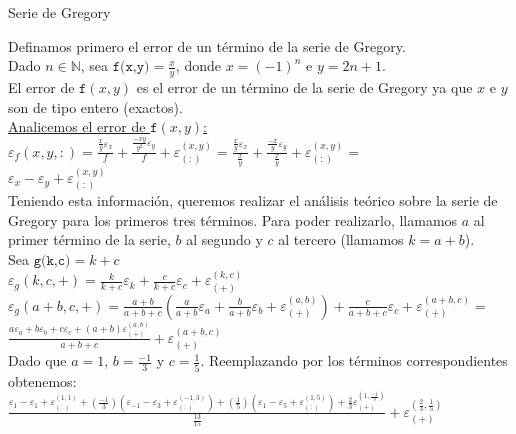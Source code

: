 \documentclass[12pt,titlepage]{article}
\newcommand{\func}[2]{\texttt{#1}(#2)}
\newcommand{\funcFull}[2]{\texttt{#1}=#2}
\newcommand{\e}[2]{\varepsilon  _{#1}({#2})}
\newcommand{\er}[2]{\varepsilon _{({#1})}^{({#2})}}
\newcommand{\ev}[1]{\varepsilon _{#1}}
\newcommand{\N}{\mathbb{N}}
\begin{document}
	\begin{section}{Serie de Gregory}

		\large
		
		Definamos primero el error de un término de la serie de Gregory.\\

		Dado $n \in \N$, sea $\funcFull{f(x,y)} {\frac{x}{y}}$, donde $x=(-1)^n$ e $y=2n+1$.\\
		
		El error de $\func{f}{x,y}$ es el error de un término de la serie de Gregory ya que $x$ e $y$ son de tipo entero (exactos).\\
		
		\underline{Analicemos el error de $\func{f}{x,y}$:}\\
		
		$\funcFull{$\e{f}{x,y,:}$}{\frac{\frac{x}{y}\ev{x}}{f} + \frac{\frac{-xy}{y^2}\ev{y}}{f} + \er{:}{x,y}} = 
		\frac{\frac{x}{y}\ev{x}}{\frac{x}{y}} + \frac{\frac{-x}{y}\ev{y}}{\frac{x}{y}} + \er{:}{x,y} =$\\
		
		$\ev{x} - \ev{y} + \er{:}{x,y}$\\
		
		Teniendo esta información, queremos realizar el análisis teórico sobre la serie de Gregory para los primeros tres términos. Para poder realizarlo, llamamos $a$ al primer término de la serie,
		$b$ al segundo y $c$ al tercero (llamamos $k=a+b$).\\
		
		Sea $\funcFull{g(k,c)}{k+c}$\\
		
		$\e{g}{k,c,+} = \frac{k}{k+c}\ev{k} + \frac{c}{k+c}\ev{c} + \er{+}{k,c}$\\
		
		$\e{g}{a+b,c,+} = \frac{a+b}{a+b+c}(\frac{a}{a+b}\ev{a} + \frac{b}{a+b}\ev{b} + \er{+}{a,b}) + \frac{c}{a+b+c}\ev{c} + \er{+}{a+b,c} =$\\
		
		$\frac{a\ev{a} + b\ev{b} + c\ev{c} + (a+b)\er{+}{a,b}}{a+b+c} + \er{+}{a+b,c}$\\
		
		Dado que $a=1$, $b=\frac{-1}{3}$ y $c=\frac{1}{5}$. Reemplazando por los términos correspondientes obtenemos:\\
		
		$\frac{\ev{1} - \ev{1} + \er{:}{1,1} + (\frac{-1}{3})(\ev{-1} - \ev{3} + \er{:}{-1,3}) + (\frac{1}{5})(\ev{1} - \ev{5} + \er{:}{1,5}) + \frac{2}{3} \er{+}{1,\frac{-1}{3}}}{\frac{13}{15}} + \er{+}{\frac{2}{3},\frac{1}{5}}$\\
		
		\color{red}{Falta calcular el error de multiplicar esto por 4}
	\end{section}
\end{document}
